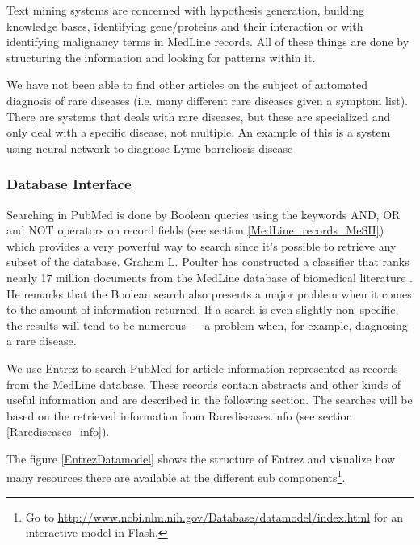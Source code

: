 Text mining systems are concerned with hypothesis generation, building
knowledge bases, identifying gene/proteins and their interaction or
with identifying malignancy terms in MedLine records. All of these
things are done by structuring the information and looking for
patterns within it.

We have not been able to find other articles on the subject of
automated diagnosis of rare diseases (i.e. many different rare
diseases given a symptom list). There are systems that deals with rare
diseases, but these are specialized and only deal with a specific
disease, not multiple. An example of this is a system using neural
network to diagnose Lyme borreliosis disease \cite{AutomatedNNLyme}

\subsubsection{Database Interface}
Searching in PubMed is done by Boolean queries using the keywords AND,
OR and NOT operators on record fields (see section
\ref{MedLine_records_MeSH}) which provides a very powerful way to
search since it's possible to retrieve any subset of the
database. Graham L. Poulter has constructed a classifier that ranks
nearly 17 million documents from the MedLine database of biomedical
literature \cite{RapidClassification}. He remarks that the Boolean
search also presents a major problem when it comes to the amount of
information returned. If a search is even slightly non--specific, the
results will tend to be numerous --- a problem when, for example,
diagnosing a rare disease.

We use Entrez to search PubMed for article information
represented as records from the MedLine database. These records
contain abstracts and other kinds of useful information and are
described in the following section. The searches will be based on the
retrieved information from Rarediseases.info
(see section \ref{Rarediseases_info}).  

The figure \ref{EntrezDatamodel} shows the structure of Entrez and
visualize how many resources there are available at the different
sub components\footnote{Go to
  \href{http://www.ncbi.nlm.nih.gov/Database/datamodel/index.html}{http://www.ncbi.nlm.nih.gov/Database/datamodel/index.html}
  for an interactive model in Flash.}.

